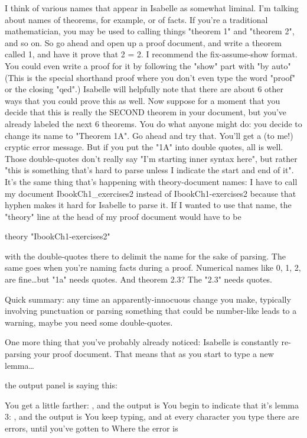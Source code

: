 I think of various names that appear in Isabelle as somewhat liminal. I'm talking about names of theorems, for example, or of facts. If you're a traditional mathematician, you may be used to calling things "theorem 1" and "theorem 2", and so on. So go ahead and open up a proof document, and write a theorem called 1, and have it prove that 2 = 2. I recommend the fix-assume-show format. You could even write a proof for it by following the "show" part with "by auto"  (This is the special shorthand proof where you don't even type the word "proof" or the closing "qed".) Isabelle will helpfully note that there are about 6 other ways that you could prove this as well. Now suppose for a moment that you decide that this is really the SECOND theorem in your document, but you've already labeled the next 6 theorems. You do what anyone might do: you decide to change its name to "Theorem 1A". Go ahead and try that. You'll get a (to me!) cryptic error message. But if you put the "1A" into double quotes, all is well. Those double-quotes don't really say "I'm starting inner syntax here", but rather "this is something that's hard to parse unless I indicate the start and end of it". It's the same thing that's happening with theory-document names: I have to call my document  IbookCh1_exercises2 instead of  IbookCh1-exercises2 because that hyphen makes it hard for Isabelle to parse it. If I wanted to use that name, the "theory" line at the head of my proof document would have to be 

theory "IbookCh1-exercises2"

with the double-quotes there to delimit the name for the sake of parsing. The same goes when you're naming facts during a proof. Numerical names like 0, 1, 2, are fine…but "1a" needs quotes. And theorem 2.3? The "2.3" needs quotes. 

Quick summary: any time an apparently-innocuous change you make, typically involving punctuation or parsing something that could be number-like leads to a warning, maybe you need some double-quotes.

One more thing that you've probably already noticed: Isabelle is constantly re-parsing your proof document. That means that as you start to type a new lemma…

the output panel is saying this:

You get a little farther: , and the output is 
You begin to indicate that it's lemma 3: , and the output is 
You keep typing, and at every character you type there are errors, until you've gotten to 
Where the error is 

